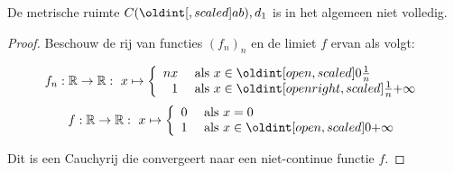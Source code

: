 \documentclass[main.tex]{subfiles}
\begin{document}
\begin{vb}
  De metrische ruimte $C(\interval{a}{b}),d_{1}$ is in het algemeen niet volledig.

  \begin{proof}
    Beschouw de rij van functies $(f_{n})_{n}$ en de limiet $f$ ervan als volgt:

    \noindent
    \begin{minipage}{.45\textwidth}
      \begin{figure}[H]
        \centering
      \end{figure}
    \end{minipage}
    \begin{minipage}{.45\textwidth}
      \[
      f_{n}: \mathbb{R} \rightarrow \mathbb{R}:\ x \mapsto
      \left\{
        \begin{array}{rl}
          nx & \text{ als } x \in \interval[open      ]{0}{\frac{1}{n}}\\
          1  & \text{ als } x \in \interval[open right]{\frac{1}{n}}{+\infty}\\
        \end{array}
      \right.
      \]
      \[
      f: \mathbb{R} \rightarrow \mathbb{R}:\ x \mapsto
      \left\{
        \begin{array}{rl}
          0  & \text{ als } x = 0\\
          1  & \text{ als } x \in \interval[open]{0}{+\infty}\\
        \end{array}
      \right.
      \]
    \end{minipage}

    Dit is een Cauchyrij die convergeert naar een niet-continue functie $f$.
  \end{proof}
\end{vb}
\end{document}
